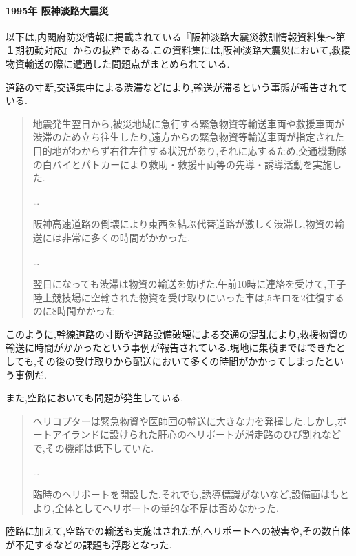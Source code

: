 \documentclass{article}[jsarticle]
\begin{document}
\paragraph{1995年 阪神淡路大震災} 
以下は,内閣府防災情報に掲載されている『阪神淡路大震災教訓情報資料集～第１期初動対応』からの抜粋である.この資料集には,阪神淡路大震災において,救援物資輸送の際に遭遇した問題点がまとめられている.\par
道路の寸断,交通集中による渋滞などにより,輸送が滞るという事態が報告されている.
\begin{quote}
    地震発生翌日から,被災地域に急行する緊急物資等輸送車両や救援車両が渋滞のため立ち往生したり,遠方からの緊急物資等輸送車両が指定された目的地がわからず右往左往する状況があり,それに応するため,交通機動隊の白バイとパトカーにより救助・救援車両等の先導・誘導活動を実施した.\par 
    \ldots \par
    阪神高速道路の倒壊により東西を結ぶ代替道路が激しく渋滞し,物資の輸送には非常に多くの時間がかかった.\par 
    \ldots \par
    翌日になっても渋滞は物資の輸送を妨げた.午前10時に連絡を受けて,王子陸上競技場に空輸された物資を受け取りにいった車は,5キロを2往復するのに8時間かかった
\end{quote}
このように,幹線道路の寸断や道路設備破壊による交通の混乱により,救援物資の輸送に時間がかかったという事例が報告されている.現地に集積まではできたとしても,その後の受け取りから配送において多くの時間がかかってしまったという事例だ. \par 
また,空路においても問題が発生している.
\begin{quote}
    ヘリコプターは緊急物資や医師団の輸送に大きな力を発揮した.しかし,ポートアイランドに設けられた肝心のヘリポートが滑走路のひび割れなどで,その機能は低下していた.\par
    \ldots \par
    臨時のヘリポートを開設した.それでも,誘導標識がないなど,設備面はもとより,全体としてヘリポートの量的な不足は否めなかった.
\end{quote}
陸路に加えて,空路での輸送も実施はされたが,ヘリポートへの被害や,その数自体が不足するなどの課題も浮彫となった.
\end{document}
